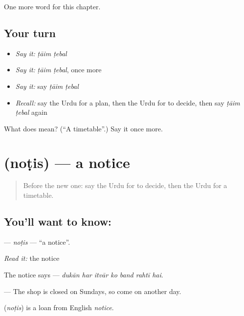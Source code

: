 \begin{grammarlens}[title={What you've built}]
One more word for this chapter.
\end{grammarlens}

\subsection*{Your turn}
\begin{itemize}
\raggedright
  \item \emph{Say it:} \emph{ṭāim ṭebal}
  \item \emph{Say it:} \emph{ṭāim ṭebal}, once more
  \item \emph{Say it:} say \emph{ṭāim ṭebal}
  \item \emph{Recall:} say the Urdu for a plan, then the Urdu for to decide, then say \emph{ṭāim ṭebal} again
\end{itemize}

\begin{tcolorbox}[breakable,colback=teal!4,colframe=teal!35!black,title={Before you move on}]
What does   mean? (\textquotedblleft{}A timetable\textquotedblright{}.) Say it once more.
\end{tcolorbox}
\section[\texorpdfstring{\ur{نوٹس} (noṭis)}{نوٹس (noṭis)}]{ (noṭis) — a notice}

\label{lesson:UR-C146-notis}



\begin{quote}
Before the new one: say the Urdu for to decide, then the Urdu for a timetable.
\end{quote}

\subsection*{You'll want to know: }
\textbf{} — \emph{noṭis} — \textquotedblleft{}a notice\textquotedblright{}.

\emph{Read it:} the notice

The notice says \textbf{      } — \emph{dukān har itvār ko band rahtī hai}.

— The shop is closed on Sundays, so come on another day.

\begin{cousinweb}
\textbf{} (\emph{noṭis}) is a loan from English \emph{notice}.
\end{cousinweb}

